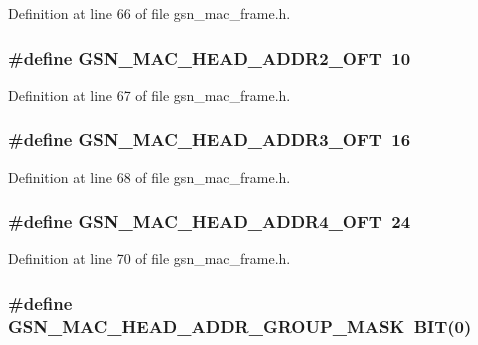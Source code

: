 Definition at line 66 of file gsn\_\-mac\_\-frame.h.

\hypertarget{a00523_acb11c574787c9741968275884b9b3981}{
\subsubsection[{GSN\_\-MAC\_\-HEAD\_\-ADDR2\_\-OFT}]{\setlength{\rightskip}{0pt plus 5cm}\#define GSN\_\-MAC\_\-HEAD\_\-ADDR2\_\-OFT~10}}
\label{a00523_acb11c574787c9741968275884b9b3981}


Definition at line 67 of file gsn\_\-mac\_\-frame.h.

\hypertarget{a00523_a44bd2ee1b158e01db8d4542f0183496d}{
\subsubsection[{GSN\_\-MAC\_\-HEAD\_\-ADDR3\_\-OFT}]{\setlength{\rightskip}{0pt plus 5cm}\#define GSN\_\-MAC\_\-HEAD\_\-ADDR3\_\-OFT~16}}
\label{a00523_a44bd2ee1b158e01db8d4542f0183496d}


Definition at line 68 of file gsn\_\-mac\_\-frame.h.

\hypertarget{a00523_a8f6bef923f5f6f9a1418430254787088}{
\subsubsection[{GSN\_\-MAC\_\-HEAD\_\-ADDR4\_\-OFT}]{\setlength{\rightskip}{0pt plus 5cm}\#define GSN\_\-MAC\_\-HEAD\_\-ADDR4\_\-OFT~24}}
\label{a00523_a8f6bef923f5f6f9a1418430254787088}


Definition at line 70 of file gsn\_\-mac\_\-frame.h.

\hypertarget{a00523_ac88624583249395e2cd6094d14479994}{
\subsubsection[{GSN\_\-MAC\_\-HEAD\_\-ADDR\_\-GROUP\_\-MASK}]{\setlength{\rightskip}{0pt plus 5cm}\#define GSN\_\-MAC\_\-HEAD\_\-ADDR\_\-GROUP\_\-MASK~BIT(0)}}
\label{a00523_ac88624583249395e2cd6094d14479994}


